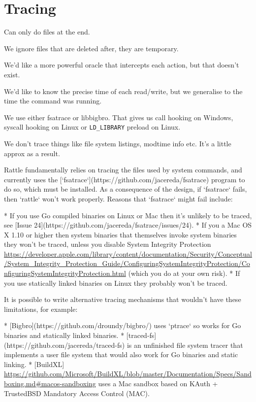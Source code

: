\section{Tracing}
\label{sec:tracing}

Can only do files at the end.

We ignore files that are deleted after, they are temporary.

We'd like a more powerful oracle that intercepts each action, but that doesn't exist.

We'd like to know the precise time of each read/write, but we generalise to the time the command was running.

We use either fsatrace or libbigbro. That gives us call hooking on Windows, syscall hooking on Linux or \verb"LD_LIBRARY" preload on Linux.

We don't trace things like file system listings, modtime info etc. It's a little approx as a result.

Rattle fundamentally relies on tracing the files used by system commands, and currently uses the [`fsatrace`](https://github.com/jacereda/fsatrace) program to do so, which must be installed. As a consequence of the design, if `fsatrace` fails, then `rattle` won't work properly. Reasons that `fsatrace` might fail include:

* If you use Go compiled binaries on Linux or Mac then it's unlikely to be traced, see [Issue 24](https://github.com/jacereda/fsatrace/issues/24).
* If you a Mac OS X 1.10 or higher then system binaries that themselves invoke system binaries they won't be traced, unless you disable System Integrity Protection \url{https://developer.apple.com/library/content/documentation/Security/Conceptual/System_Integrity_Protection_Guide/ConfiguringSystemIntegrityProtection/ConfiguringSystemIntegrityProtection.html} (which you do at your own risk).
* If you use statically linked binaries on Linux they probably won't be traced.

It is possible to write alternative tracing mechanisms that wouldn't have these limitations, for example:

* [Bigbro](https://github.com/droundy/bigbro/) uses `ptrace` so works for Go binaries and statically linked binaries.
* [traced-fs](https://github.com/jacereda/traced-fs) is an unfinished file system tracer that implements a user file system that would also work for Go binaries and static linking.
* [BuildXL] \url{https://github.com/Microsoft/BuildXL/blob/master/Documentation/Specs/Sandboxing.md#macos-sandboxing} uses a Mac sandbox based on KAuth + TrustedBSD Mandatory Access Control (MAC).
